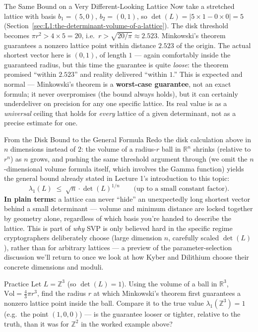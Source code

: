 \begin{exbox}{The Same Bound on a Very Different-Looking Lattice}
Now take a stretched lattice with basis $b_1 = (5,0)$, $b_2 = (0,1)$, so $\det(L) = |5 \times 1 - 0 \times 0| = 5$ (Section~\ref{sec:L1:the-determinant-volume-of-a-lattice}). The disk threshold becomes $\pi r^2 > 4 \times 5 = 20$, i.e.\ $r > \sqrt{20/\pi} \approx 2.523$. Minkowski's theorem guarantees a nonzero lattice point within distance $2.523$ of the origin. The actual shortest vector here is $(0,1)$, of length $1$ --- again comfortably inside the guaranteed radius, but this time the guarantee is quite \emph{loose}: the theorem promised ``within $2.523$'' and reality delivered ``within $1$.'' This is expected and normal --- Minkowski's theorem is a \textbf{worst-case guarantee}, not an exact formula; it never overpromises (the bound always holds), but it can certainly underdeliver on precision for any one specific lattice. Its real value is as a \emph{universal} ceiling that holds for \emph{every} lattice of a given determinant, not as a precise estimate for one.
\end{exbox}

\begin{rmkbox}{From the Disk Bound to the General Formula}
Redo the disk calculation above in $n$ dimensions instead of $2$: the volume of a radius-$r$ ball in $\mathbb{R}^n$ shrinks (relative to $r^n$) as $n$ grows, and pushing the same threshold argument through (we omit the $n$-dimensional volume formula itself, which involves the Gamma function) yields the general bound already stated in Lecture 1's introduction to this topic:
$$
\lambda_1(L) \;\le\; \sqrt{n}\cdot \det(L)^{1/n} \qquad \text{(up to a small constant factor).}
$$
\textbf{In plain terms:} a lattice can never ``hide'' an unexpectedly long shortest vector behind a small determinant --- volume and minimum distance are locked together by geometry alone, regardless of which basis you're handed to describe the lattice. This is part of \emph{why} SVP is only believed hard in the specific regime cryptographers deliberately choose (large dimension $n$, carefully scaled $\det(L)$), rather than for arbitrary lattices --- a preview of the parameter-selection discussion we'll return to once we look at how Kyber and Dilithium choose their concrete dimensions and moduli.
\end{rmkbox}

\begin{exercisebox}{Practice}
Let $L = \mathbb{Z}^3$ (so $\det(L)=1$). Using the volume of a ball in $\mathbb{R}^3$, $\mathrm{Vol} = \tfrac{4}{3}\pi r^3$, find the radius $r$ at which Minkowski's theorem first guarantees a nonzero lattice point inside the ball. Compare it to the true value $\lambda_1(\mathbb{Z}^3) = 1$ (e.g.\ the point $(1,0,0)$) --- is the guarantee looser or tighter, relative to the truth, than it was for $\mathbb{Z}^2$ in the worked example above?
\end{exercisebox}

